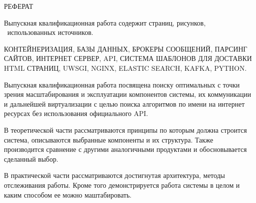 \begin{center}
РЕФЕРАТ
\end{center}









Выпускная квалификационная работа содержит \pageref{LastPage} страниц, \totfig{}
рисунков, \ использованных источников.

КОНТЕЙНЕРИЗАЦИЯ, БАЗЫ ДАННЫХ, БРОКЕРЫ СООБЩЕНИЙ, ПАРСИНГ САЙТОВ, ИНТЕРНЕТ
СЕРВЕР, API, СИСТЕМА ШАБЛОНОВ ДЛЯ ДОСТАВКИ HTML СТРАНИЦ, UWSGI, NGINX, ELASTIC
SEARCH, KAFKA, PYTHON.

Выпускная квалификационная работа посвящена поиску оптимальных с точки зрения
масштабирования и эксплуатации компонентов системы, их коммуникации и дальнейшей
виртуализации с целью поиска алгоритмов по имени на интернет ресурсах без
использования официального API.

В теоретической части рассматриваются принципы по которым должна строится
система, описываются выбранные компоненты и их структура. Также производится
сравнение с другими аналогичными продуктами и обосновывается сделанный выбор.

В практической части рассматриваются достигнутая архитектура, методы
отслеживания работы. Кроме того демонстрируется работа системы в целом и каким
способом ее можно маштабировать.
